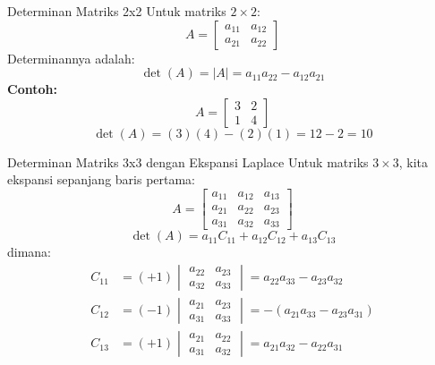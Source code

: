 \documentclass{beamer}
\begin{document}
\begin{frame}[t,fragile]{Determinan Matriks 2x2}
Untuk matriks $2 \times 2$:
$$ A = \begin{bmatrix}
       	a_{11} & a_{12} \\
	    a_{21} & a_{22}
        \end{bmatrix} $$
Determinannya adalah:
$$ \det(A) = |A| = a_{11}a_{22} - a_{12}a_{21} $$
\vspace{0.3cm}
\textbf{Contoh:}\\
$$ A = \begin{bmatrix}
       	3 & 2 \\
	    1 & 4
        \end{bmatrix} $$
$$ \det(A) = (3)(4) - (2)(1) = 12 - 2 = 10 $$
\end{frame}

\begin{frame}[t,fragile]{Determinan Matriks 3x3 dengan Ekspansi Laplace}
Untuk matriks $3 \times 3$, kita ekspansi sepanjang baris pertama:
$$ A = \begin{bmatrix}
       	a_{11} & a_{12} & a_{13} \\
	    a_{21} & a_{22} & a_{23} \\
	    a_{31} & a_{32} & a_{33}
        \end{bmatrix} $$
$$ \det(A) = a_{11}C_{11} + a_{12}C_{12} + a_{13}C_{13} $$
dimana:
\begin{align*}
C_{11} &= (+1) \begin{vmatrix} a_{22} & a_{23} \\ a_{32} & a_{33} \end{vmatrix} = a_{22}a_{33} - a_{23}a_{32} \\
C_{12} &= (-1) \begin{vmatrix} a_{21} & a_{23} \\ a_{31} & a_{33} \end{vmatrix} = -(a_{21}a_{33} - a_{23}a_{31}) \\
C_{13} &= (+1) \begin{vmatrix} a_{21} & a_{22} \\ a_{31} & a_{32} \end{vmatrix} = a_{21}a_{32} - a_{22}a_{31}
\end{align*}
\end{frame}
\end{document}
